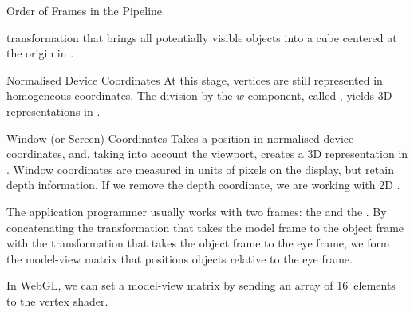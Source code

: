\documentclass[../COS3712_Notes.tex]{subfiles}
\begin{document}
\begin{sidenote}{Order of Frames in the Pipeline}
\begin{descriptenum}
            transformation that brings all potentially visible objects into a cube centered
            at the origin in .
          \item[Normalised Device Coordinates] At this stage, vertices are still represented
            in homogeneous coordinates.
            The division by the $w$ component, called ,
            yields 3D representations in .
          \item[Window (or Screen) Coordinates] Takes a position in normalised device coordinates,
            and, taking into account the viewport, creates a 3D representation in
            .
            Window coordinates are measured in units of pixels on the display,
            but retain depth information.
            If we remove the depth coordinate, we are working with 2D .
        \end{descriptenum}
      \end{sidenote}

      The application programmer usually works with two frames: the 
      and the .
      By concatenating the transformation that takes the model frame to the object frame
      with the transformation that takes the object frame to the eye frame,
      we form the model-view matrix that positions objects relative to the eye frame.

      In WebGL, we can set a model-view matrix by sending an array of 16~elements to the
      vertex shader.
\end{document}
